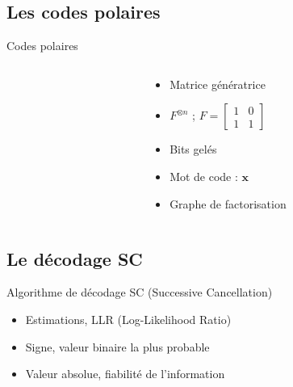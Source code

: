 \subsection*{Les codes polaires}
\begin{frame}[c]{Codes polaires}
	\begin{columns}[T] %
		\begin{column}{.65\textwidth}
		\end{column}
		\begin{column}{.35\textwidth}
		\begin{itemize}
			\item<1-> Matrice génératrice
			\item<1->$F^{\otimes n}$ ; $F=\left[\begin{smallmatrix} 1 & 0 \\ 1 & 1\end{smallmatrix}\right]$
			\item<2-> Bits gelés
			\item<3-> Mot de code : $\mathbold{x}$
			\item<4-> Graphe de factorisation
		\end{itemize}
		\end{column}

	\end{columns}

\end{frame}
\subsection*{Le décodage SC}

\begin{frame}[c]{Algorithme de décodage SC (Successive Cancellation)}
	\begin{itemize}
		\item<2> Estimations, LLR (Log-Likelihood Ratio)
		\item<2> Signe, valeur binaire la plus probable
		\item<2> Valeur absolue, fiabilité de l'information
	\end{itemize}
\end{frame}

